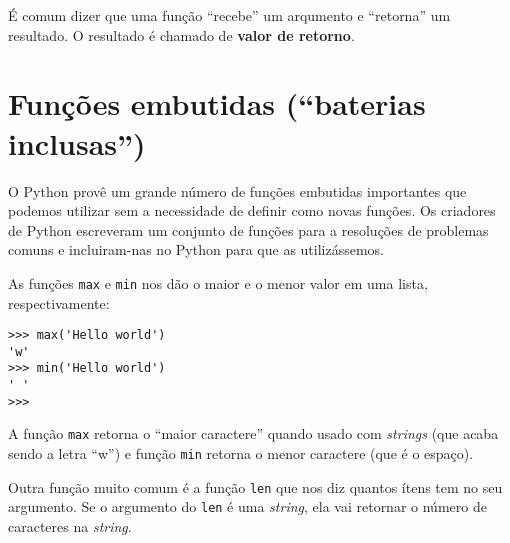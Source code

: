 É comum dizer que uma função ``recebe'' um arqumento e ``retorna'' um resultado.
O resultado é chamado de {\bf valor de retorno}.



\section{Funções embutidas (``baterias inclusas'')}

O Python provê um grande número de funções embutidas importantes que podemos
utilizar sem a necessidade de definir como novas funções. Os criadores de
Python escreveram um conjunto de funções para a resoluções de problemas comuns
e incluiram-nas no Python para que as utilizássemos.


As funções {\tt max} e {\tt min} nos dão o maior e o menor valor em uma lista,
respectivamente:

\beforeverb
\begin{verbatim}
>>> max('Hello world')
'w'
>>> min('Hello world')
' '
>>>
\end{verbatim}
\afterverb
%
%
A função {\tt max} retorna o ``maior caractere'' quando usado com {\it strings}
(que acaba sendo a letra ``w'') e função {\tt min} retorna o menor caractere
(que é o espaço).


Outra função muito comum é a função {\tt len} que nos diz quantos ítens tem
no seu argumento. Se o argumento do {\tt len} é uma {\it string}, ela vai
retornar o número de caracteres na {\it string}.

